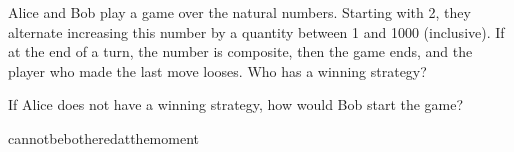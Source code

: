 \begin{problem}
        \begin{statement}
                Alice and Bob play a game over the natural numbers. Starting with 2, they alternate increasing this number by a quantity between 1 and 1000 (inclusive). If at the end of a turn, the number is composite, then the game ends, and the player who made the last move looses. Who has a winning strategy?
        \end{statement}
	\begin{hint}
	        If Alice does not have a winning strategy, how would Bob start the game?
	\end{hint}
	\begin{solution}
	        cannotbebotheredatthemoment
	\end{solution}
\end{problem}
